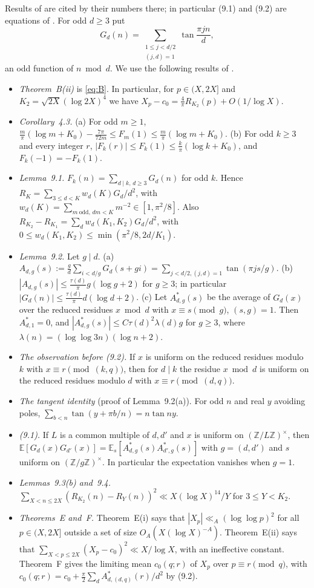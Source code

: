 \documentclass[11pt]{amsart}
\theoremstyle{remark}
\newcommand{\E}{\mathbb{E}}
\newcommand{\Z}{\mathbb{Z}}
\begin{document}
Results of \cite{TS} are cited by their numbers there; in particular (9.1) and (9.2) are equations of \cite{TS}. For odd $d\ge3$ put
\[
G_d(n)=\sum_{\substack{1\le j<d/2\\ (j,d)=1}}\tan\frac{\pi jn}d ,
\]
an odd function of $n\bmod d$. We use the following results of \cite{TS}.
\begin{itemize}
\item \emph{Theorem~B(ii)} is \eqref{eq:B}. In particular, for $p\in(X,2X]$ and $K_2=\sqrt{2X}(\log2X)^4$ we have $X_p-c_0=\frac4\pi R_{K_2}(p)+O(1/\log X)$.
\item \emph{Corollary~4.3.} (a) For odd $m\ge1$, $\frac m\pi(\log m+K_0)-\frac{7\pi}{72m}\le F_m(1)\le\frac m\pi(\log m+K_0)$. (b) For odd $k\ge3$ and every integer $r$, $|F_k(r)|\le F_k(1)\le\frac k\pi(\log k+K_0)$, and $F_k(-1)=-F_k(1)$.
\item \emph{Lemma~9.1.} $F_k(n)=\sum_{d\mid k,\,d\ge3}G_d(n)$ for odd $k$. Hence $R_K=\sum_{3\le d<K}w_d(K)G_d/d^2$, with $w_d(K)=\sum_{m\ \mathrm{odd},\,dm<K}m^{-2}\in[1,\pi^2/8]$. Also $R_{K_2}-R_{K_1}=\sum_dw_d(K_1,K_2)G_d/d^2$, with $0\le w_d(K_1,K_2)\le\min(\pi^2/8,2d/K_1)$.
\item \emph{Lemma~9.2.} Let $g\mid d$. (a) $A_{d,g}(s):=\frac gd\sum_{i<d/g}G_d(s+gi)=\sum_{j<d/2,(j,d)=1}\tan(\pi js/g)$. (b) $|A_{d,g}(s)|\le\frac{\tau(d)}\pi g(\log g+2)$ for $g\ge3$; in particular $|G_d(n)|\le\frac{\tau(d)}\pi d(\log d+2)$. (c) Let $A^*_{d,g}(s)$ be the average of $G_d(x)$ over the reduced residues $x\bmod d$ with $x\equiv s\pmod g$, $(s,g)=1$. Then $A^*_{d,1}=0$, and $|A^*_{d,g}(s)|\le C\tau(d)^2\lambda(d)g$ for $g\ge3$, where $\lambda(n)=(\log\log3n)(\log n+2)$.
\item \emph{The observation before (9.2).} If $x$ is uniform on the reduced residues modulo $k$ with $x\equiv r\pmod{(k,q)}$, then for $d\mid k$ the residue $x\bmod d$ is uniform on the reduced residues modulo $d$ with $x\equiv r\pmod{(d,q)}$.
\item \emph{The tangent identity} (proof of Lemma~9.2(a)). For odd $n$ and real $y$ avoiding poles, $\sum_{b<n}\tan(y+\pi b/n)=n\tan ny$.
\item \emph{(9.1).} If $L$ is a common multiple of $d,d'$ and $x$ is uniform on $(\Z/L\Z)^\times$, then $\E[G_d(x)G_{d'}(x)]=\E_s[A^*_{d,g}(s)A^*_{d',g}(s)]$ with $g=(d,d')$ and $s$ uniform on $(\Z/g\Z)^\times$. In particular the expectation vanishes when $g=1$.
\item \emph{Lemmas~9.3(b) and~9.4.} $\sum_{X<n\le2X}(R_{K_2}(n)-R_Y(n))^2\ll X(\log X)^{14}/Y$ for $3\le Y<K_2$.
\item \emph{Theorems~E and~F.} Theorem~E(i) says that $|X_p|\ll_A(\log\log p)^2$ for all $p\in(X,2X]$ outside a set of size $O_A(X(\log X)^{-A})$. Theorem~E(ii) says that $\sum_{X<p\le2X}(X_p-c_0)^2\ll X/\log X$, with an ineffective constant. Theorem~F gives the limiting mean $c_0(q;r)$ of $X_p$ over $p\equiv r\pmod q$, with $c_0(q;r)=c_0+\frac\pi2\sum_dA^*_{d,(d,q)}(r)/d^2$ by (9.2).
\end{itemize}
\end{document}
